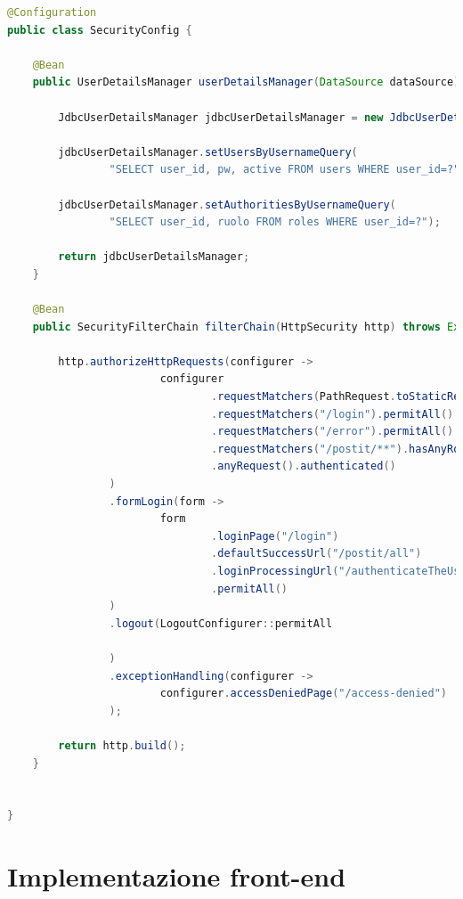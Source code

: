 \begin{lstlisting}[language=Java,basicstyle=\tiny, caption={Classe SecurityConfig.java}, captionpos=b]
@Configuration
public class SecurityConfig {

    @Bean
    public UserDetailsManager userDetailsManager(DataSource dataSource) {

        JdbcUserDetailsManager jdbcUserDetailsManager = new JdbcUserDetailsManager(dataSource);

        jdbcUserDetailsManager.setUsersByUsernameQuery(
                "SELECT user_id, pw, active FROM users WHERE user_id=?");

        jdbcUserDetailsManager.setAuthoritiesByUsernameQuery(
                "SELECT user_id, ruolo FROM roles WHERE user_id=?");

        return jdbcUserDetailsManager;
    }

    @Bean
    public SecurityFilterChain filterChain(HttpSecurity http) throws Exception {

        http.authorizeHttpRequests(configurer ->
                        configurer
                                .requestMatchers(PathRequest.toStaticResources().atCommonLocations()).permitAll()
                                .requestMatchers("/login").permitAll()
                                .requestMatchers("/error").permitAll()
                                .requestMatchers("/postit/**").hasAnyRole("EMPLOYEE")
                                .anyRequest().authenticated()
                )
                .formLogin(form ->
                        form
                                .loginPage("/login")
                                .defaultSuccessUrl("/postit/all")
                                .loginProcessingUrl("/authenticateTheUser")
                                .permitAll()
                )
                .logout(LogoutConfigurer::permitAll

                )
                .exceptionHandling(configurer ->
                        configurer.accessDeniedPage("/access-denied")
                );

        return http.build();
    }


}
\end{lstlisting}
\newpage
\section{Implementazione front-end}
